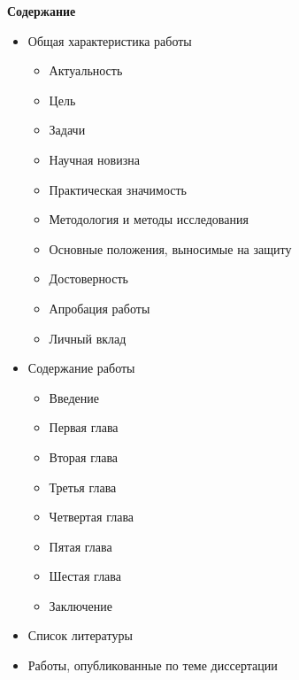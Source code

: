 \newpage
\begin{center}
{\large
\textbf{Содержание}
}
\end{center}

\begin{itemize}
	\item [] Общая характеристика работы
	\begin{itemize}
		\item[] Актуальность
		\item[] Цель
		\item[] Задачи
		\item[] Научная новизна
		\item[] Практическая значимость
		\item[] Методология и методы исследования
		\item[] Основные положения, выносимые на защиту
		\item[] Достоверность
		\item[] Апробация работы
		\item[] Личный вклад
	\end{itemize}
	\item [] Содержание работы
	\begin{itemize}
		\item[] Введение
		\item[] Первая глава
		\item[] Вторая глава
		\item[] Третья глава
		\item[] Четвертая глава
		\item[] Пятая глава
		\item[] Шестая глава
		\item[] Заключение
	\end{itemize}
	\item [] Список литературы
	\item [] Работы, опубликованные по теме диссертации
\end{itemize}


